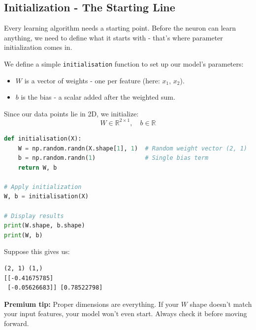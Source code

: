 \documentclass[11pt]{article}
\begin{document}
\subsection*{Initialization - The Starting Line}

\begin{tcolorbox}[colback=gray!3, colframe=black!40, title=Step 1: Initialize the Model, fonttitle=\bfseries, arc=2mm]
Every learning algorithm needs a starting point.  
Before the neuron can learn anything, we need to define what it starts with - that's where parameter initialization comes in.
\end{tcolorbox}

\vspace{1em}

We define a simple \texttt{initialisation} function to set up our model's parameters:

\begin{itemize}
    \item \textbf{$W$} is a vector of weights - one per feature (here: $x_1$, $x_2$).
    \item \textbf{$b$} is the bias - a scalar added after the weighted sum.
\end{itemize}

Since our data points lie in 2D, we initialize:
\[
W \in \mathbb{R}^{2 \times 1}, \quad b \in \mathbb{R}
\]

\vspace{0.5em}

\begin{lstlisting}[language=Python]
def initialisation(X):
    W = np.random.randn(X.shape[1], 1)  # Random weight vector (2, 1)
    b = np.random.randn(1)              # Single bias term
    return W, b

# Apply initialization
W, b = initialisation(X)

# Display results
print(W.shape, b.shape)
print(W, b)
\end{lstlisting}

\vspace{0.5em}

Suppose this gives us:

\begin{lstlisting}
(2, 1) (1,)
[[-0.41675785]
 [-0.05626683]] [0.78522798]
\end{lstlisting}

\begin{tcolorbox}[colback=white!97!gray, colframe=black!15!gray, arc=1mm]
\textbf{Premium tip:} Proper dimensions are everything.  
If your $W$ shape doesn't match your input features, your model won't even start. Always check it before moving forward.
\end{tcolorbox}
\end{document}
